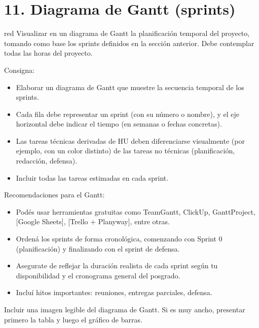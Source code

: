 \section{11. Diagrama de Gantt (sprints)}
\label{sec:gantt}


\begin{consigna}{red}
Visualizar en un diagrama de Gantt la planificación temporal del proyecto, tomando como base los sprints definidos en la sección anterior. Debe contemplar todas las horas del proyecto.

Consigna:

\begin{itemize}

\item Elaborar un diagrama de Gantt que muestre la secuencia temporal de los sprints.

\item Cada fila debe representar un sprint (con su número o nombre), y el eje horizontal debe indicar el tiempo (en semanas o fechas concretas).

\item Las tareas técnicas derivadas de HU deben diferenciarse visualmente (por ejemplo, con un color distinto) de las tareas no técnicas (planificación, redacción, defensa).

\item Incluir todas las tareas estimadas en cada sprint.
\end{itemize}

Recomendaciones para el Gantt:

\begin{itemize}

	\item Podés usar herramientas gratuitas como TeamGantt, ClickUp, GanttProject, [Google Sheets], [Trello + Planyway], entre otras.
	\item Ordená los sprints de forma cronológica, comenzando con Sprint 0 (planificación) y finalizando con el sprint de defensa.
	\item Asegurate de reflejar la duración realista de cada sprint según tu disponibilidad y el cronograma general del posgrado.
	\item Incluí hitos importantes: reuniones, entregas parciales, defensa.
\end{itemize}


Incluir una imagen legible del diagrama de Gantt. Si es muy ancho, presentar primero la tabla y luego el gráfico de barras.
\end{consigna}

